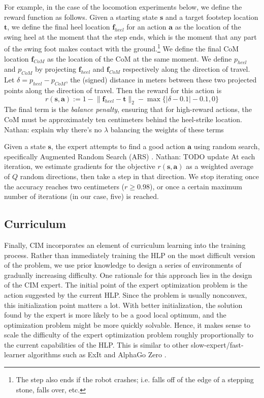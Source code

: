 \documentclass[conference]{IEEEtran}
\newcommand{\nhatch}[1]{{\leavevmode\color{magenta} Nathan: #1}}
\newcommand{\norm}[1]{\lVert #1 \rVert}
\begin{document}
For example, in the case of the locomotion experiments below, we define the reward function as follows.
Given a starting state $\mathbf{s}$ and a target footstep location $\mathbf{t}$, we define the final heel location $\mathbf{f}_{heel}$ for an action $\mathbf{a}$ as the location of the swing heel at the moment that the step ends, which is the moment that any part of the swing foot makes contact with the ground.\footnote{The step also ends if the robot crashes; i.e. falls off of the edge of a stepping stone, falls over, etc.}
We define the final CoM location $\mathbf{f}_{CoM}$ as the location of the CoM at the same moment.
We define ${p}_{heel}$ and ${p}_{CoM}$ by projecting $\mathbf{f}_{heel}$ and $\mathbf{f}_{CoM}$ respectively along the direction of travel.
Let $\delta = {p}_{heel} - {p}_{CoM}$, the (signed) distance in meters between these two projected points along the direction of travel.
Then the reward for this action is
\[
r(\mathbf{s},\mathbf{a}) := 1 - \norm{\mathbf{f}_{heel} - \mathbf{t}}_2 - \max\{|\delta-0.1|-0.1, 0\}
\]
The final term is the \emph{balance penalty}, ensuring that for high-reward actions, the CoM must be approximately ten centimeters behind the heel-strike location.\nhatch{explain why there's no $\lambda$ balancing the weights of these terms}

Given a state $\mathbf{s}$, the expert attempts to find a good action $\mathbf{a}$ using random search, specifically Augmented Random Search (ARS) \citep{mania2018simple}. \nhatch{TODO update}
At each iteration, we estimate gradients for the objective $r(\mathbf s, \mathbf a)$ as a weighted average of $Q$ random directions, then take a step in that direction.
We stop iterating once the accuracy reaches two centimeters ($r \geq 0.98$), or once a certain maximum number of iterations (in our case, five) is reached.


\subsection{Curriculum} \label{sec:curriculum}

Finally, CIM incorporates an element of curriculum learning into the training process.
Rather than immediately training the HLP on the most difficult version of the problem,
we use prior knowledge to design a series of environments of gradually increasing difficulty.
One rationale for this approach lies in the design of the CIM expert.
The initial point of the expert optimization problem is the action suggested by the current HLP.
Since the problem is usually nonconvex, this initialization point matters a lot.
With better initialization, the solution found by the expert is more likely to be a good local optimum, and the optimization problem might be more quickly solvable.
Hence, it makes sense to scale the difficulty of the expert optimization problem roughly proportionally to the current capabilities of the HLP.
This is similar to other slow-expert/fast-learner algorithms such as ExIt \citep{anthony2017thinking} and AlphaGo Zero \citep{silver2017mastering}.
\end{document}
